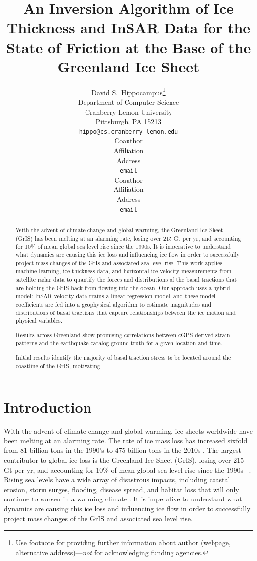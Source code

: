 \documentclass{article}
\title{An Inversion Algorithm of Ice Thickness and InSAR Data for
the State of Friction at the Base of the Greenland Ice Sheet}
\author{%
  David S.~Hippocampus\thanks{Use footnote for providing further information
    about author (webpage, alternative address)---\emph{not} for acknowledging
    funding agencies.} \\
  Department of Computer Science\\
  Cranberry-Lemon University\\
  Pittsburgh, PA 15213 \\
  \texttt{hippo@cs.cranberry-lemon.edu} \\
   \And
   Coauthor \\
   Affiliation \\
   Address \\
   \texttt{email} \\
   \AND
   Coauthor \\
   Affiliation \\
   Address \\
   \texttt{email} \\
}
\begin{document}
\maketitle

\begin{abstract}
With the advent of climate change and global warming, the Greenland Ice Sheet (GrIS) has been melting at an alarming rate, losing over 215 Gt per yr, and accounting for 10\% of mean global sea level rise since the 1990s. It is imperative to understand what dynamics are causing this ice loss and influencing ice flow in order to successfully project mass changes of the GrIs and associated sea level rise. This work applies machine learning, ice thickness data, and horizontal ice velocity measurements from satellite radar data to quantify the forces and distributions of the basal tractions that are holding the GrIS back from flowing into the ocean. Our approach uses a hybrid model: InSAR velocity data trains a linear regression model, and these model coefficients are fed into a geophysical algorithm to estimate magnitudes and distributions of basal tractions that capture relationships between the ice motion and physical variables. 

Results across Greenland show promising correlations between cGPS derived strain patterns and the earthquake catalog ground truth for a given location and time.

Initial results identify the majority of basal traction stress to be located around the coastline of the GrIS, motivating 


\end{abstract}

\section{Introduction}

With the advent of climate change and global warming, ice sheets worldwide have been melting at an alarming rate. The rate of ice mass loss has increased sixfold from 81 billion tons in the 1990’s to 475 billion tons in the 2010s \cite{the_imbie_team_mass_2020}. The largest contributor to global ice loss is the Greenland Ice Sheet (GrIS), losing over 215 Gt per yr, and accounting for 10\% of mean global sea level rise since the 1990s ~\cite{stocker_climate_2013}. Rising sea levels have a wide array of disastrous impacts, including coastal erosion, storm surges, flooding, disease spread, and habitat loss that will only continue to worsen in a warming climate \cite{pattyn_greenland_2018}. It is imperative to understand what dynamics are causing this ice loss and influencing ice flow in order to successfully project mass changes of the GrIS and associated sea level rise.
\end{document}

